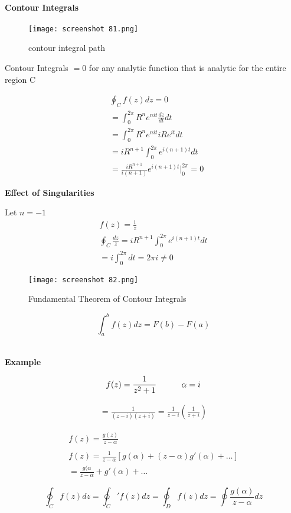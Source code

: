 \documentclass[svgnames]{article}   	%
\begin{document}
\paragraph{Contour Integrals}
\begin{figure}[H]
  \centering
    \texttt{[image: screenshot 81.png]}
    \caption{contour integral path}
\end{figure}


\vspace{5px}
Contour Integrals $ = 0$ for any analytic function that is analytic for the
entire region C

\begin{align*}
  &\oint_C f(z) dz = 0 \\
  &= \int_0^{2\pi} R^n e^{nit} \frac{dz}{dt}dt \\
  &= \int_0^{2\pi} R^n e^{nit} iRe^{it} dt  \\
  &= iR^{n+1} \int_0^{2\pi} e^{i(n+1)t} dt \\
  &= \frac{iR^{n+1}}{i(n+1)} e^{i(n+1)t} \Big|_0^{2\pi} = 0
\end{align*}

\textbf{Effect of Singularities}

Let $n = -1$
\begin{align*}
  f(z) = \frac{1}{z} \\
  \oint_C \frac{dz}{z} = iR^{n+1} \int_0^{2\pi} e^{i(n+1)t} dt \\
  = i \int_0^{2\pi} dt = 2\pi i \neq 0
\end{align*}

\begin{figure}[H]
  \centering
    \texttt{[image: screenshot 82.png]}
    \caption{Fundamental Theorem of Contour Integrals}
\end{figure}



\begin{tcolorbox}	
  
  \[
  \int_a^b f(z) dz = F(b) - F(a) 
  \]
  
  
\end{tcolorbox}	
\mbox{} \\
\textbf{Example}

\[
  f(z) = \frac{1}{z^2 + 1} \hspace{30px} \alpha = i
\]

\begin{align*}
  = \frac{1}{(z-i)(z+i)} = \frac{1}{z-i} \left(\frac{1}{z+i}\right)
\end{align*}

\begin{align*}
  f(z) = \frac{g(z)}{z - \alpha} \\\\
  f(z) = \frac{1}{z-\alpha} [g(\alpha) + (z-\alpha)g'(\alpha) + \dots] \\
  = \frac{g(\alpha}{z - \alpha} + g'(\alpha) + \dots  
\end{align*}

\begin{tcolorbox}	
  
  \[
  \oint_C f(z)dz = \oint_C' f(z)dz = \oint_D f(z)dz = \oint
  \frac{g(\alpha)}{z-\alpha} dz
  \]

\end{tcolorbox}	
\end{document}

